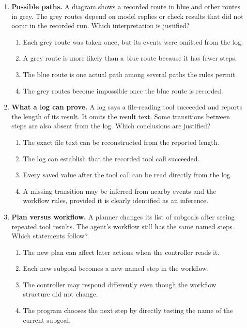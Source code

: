 \begin{enumerate}[start=1,itemsep=0.7\baselineskip]
\item\label{exercise:7} \begin{minipage}[t]{\linewidth}
\textbf{Possible paths.} A diagram shows a recorded route in blue and other routes in grey. The grey routes depend on model replies or check results that did not occur in the recorded run. Which interpretation is justified?
\begin{enumerate}[label=\textnormal{(\Alph*)},leftmargin=*,itemsep=0pt]
\item Each grey route was taken once, but its events were omitted from the log.
\item A grey route is more likely than a blue route because it has fewer steps.
\item The blue route is one actual path among several paths the rules permit.
\item The grey routes become impossible once the blue route is recorded.
\end{enumerate}
\end{minipage}

\item\label{exercise:8} \begin{minipage}[t]{\linewidth}
\textbf{What a log can prove.} A log says a file-reading tool succeeded and reports the length of its result. It omits the result text. Some transitions between steps are also absent from the log. Which conclusions are justified?
\begin{enumerate}[label=\textnormal{(\Alph*)},leftmargin=*,itemsep=0pt]
\item The exact file text can be reconstructed from the reported length.
\item The log can establish that the recorded tool call succeeded.
\item Every saved value after the tool call can be read directly from the log.
\item A missing transition may be inferred from nearby events and the workflow rules, provided it is clearly identified as an inference.
\end{enumerate}
\end{minipage}

\item\label{exercise:9} \begin{minipage}[t]{\linewidth}
\textbf{Plan versus workflow.} A planner changes its list of subgoals after seeing repeated tool results. The agent's workflow still has the same named steps. Which statements follow?
\begin{enumerate}[label=\textnormal{(\Alph*)},leftmargin=*,itemsep=0pt]
\item The new plan can affect later actions when the controller reads it.
\item Each new subgoal becomes a new named step in the workflow.
\item The controller may respond differently even though the workflow structure did not change.
\item The program chooses the next step by directly testing the name of the current subgoal.
\end{enumerate}
\end{minipage}


\end{enumerate}
